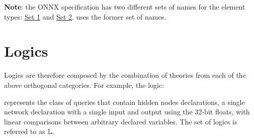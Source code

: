 \textbf{Note}: the ONNX specification has two different sets of names for the element types: \href{https://onnx.ai/onnx/repo-docs/IR.html#tensor-element-types}{Set 1} and \href{https://onnx.ai/onnx/intro/concepts.html#element-type}{Set 2}. \vnnlib{} uses the former set of names.

\section{Logics}

Logics are therefore composed by the combination of theories from each of the above orthogonal categories. For example, the logic:
\begin{center}
\end{center}
represents the class of queries that contain hidden nodes declarations, a single network declaration with a single input and output using the 32-bit floats, with linear comparisons between arbitrary declared variables.
The set of logics is referred to as $\mathbb{L}$. 